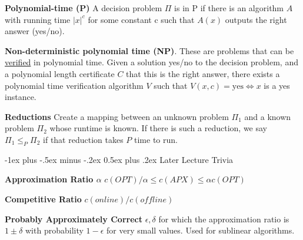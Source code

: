 \documentclass[10pt,landscape]{article}
\makeatletter
\renewcommand{\section}{\@startsection{section}{1}{0mm}%
                                {-1ex plus -.5ex minus -.2ex}%
                                {0.5ex plus .2ex}%
                                {\normalfont\large\bfseries}}
\newcommand{\definition}[1]{\textbf{#1}\hspace{2pt}}
\makeatother
\begin{document}
\begin{multicols}{3}
\definition{Polynomial-time (P)} A decision problem $\Pi$ is in P if there is an algorithm $A$ with running time $|x|^c$ for some constant c such that $A(x)$ outputs the right answer (yes/no).

\definition{Non-deterministic polynomial time (NP)}. These are problems that can be \underline{verified} in polynomial time. Given a solution yes/no to the decision problem, and a polynomial length certificate $C$ that this is the right answer, there exists a polynomial time verification algorithm $V$ such that $V(x,c) = \text{yes} \Leftrightarrow x $ is a yes instance.

\definition{Reductions} Create a mapping between an unknown problem $\Pi_1$ and a known problem $\Pi_2$ whose runtime is known. If there is such a reduction, we say $\Pi_1 \leq_P \Pi_2$ if that reduction takes $P$ time to run.


\section{Later Lecture Trivia}

\definition{Approximation Ratio $\alpha$} $c(OPT)/\alpha \leq c(APX) \leq \alpha c(OPT)$

\definition{Competitive Ratio} $c(online)/c(offline)$

\definition{Probably Approximately Correct} $\epsilon, \delta$ for which the approximation ratio is $1 \pm \delta$ with probability $1-\epsilon$ for very small values. Used for sublinear algorithms.

\end{multicols}
\end{document}
